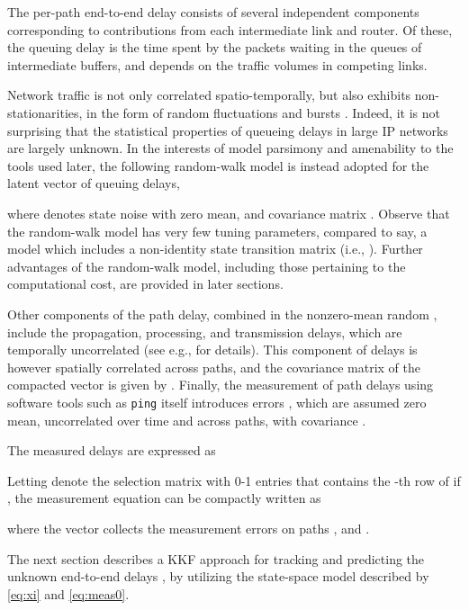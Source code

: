 \documentclass[draftcls,onecolumn,12pt]{IEEEtran}
\theoremstyle{plain}\newtheorem{thm}{Theorem}
\theoremstyle{definition}
\theoremstyle{remark}
\begin{document}
The per-path end-to-end delay  consists of several independent components corresponding to contributions from each intermediate link and router. 
Of these, the queuing delay  is the time spent by the packets waiting in the queues of intermediate buffers, and depends on the traffic volumes in competing links. 
{ Network traffic is not only correlated spatio-temporally, but also exhibits non-stationarities, in the form of random fluctuations and bursts \cite{structural}.
Indeed, it is not surprising that the statistical properties of queueing delays in large IP networks are largely unknown.
In the interests of model parsimony and amenability to the tools used later, the following random-walk model is instead adopted for the latent vector of queuing delays,

where  denotes state noise with zero mean, and covariance matrix . Observe that the random-walk model has very few tuning parameters, compared to say, a model which includes a non-identity state transition matrix (i.e., ). Further advantages of the random-walk model, including those pertaining to the computational cost, are provided in later sections.}

Other components of the path delay, combined in the nonzero-mean random , include the propagation, processing, and transmission delays, which are temporally uncorrelated (see e.g., \cite{bovy} for details).
This component of delays is however spatially correlated across paths, and the covariance matrix of the compacted vector  is given by .
Finally, the measurement of path delays using software tools such as \texttt{ping} itself introduces errors , which are assumed zero mean, uncorrelated over time and across paths, with covariance .

The measured delays are expressed as

Letting  denote the  selection matrix with 0-1 entries that contains the -th row of  if , the measurement equation can be compactly written as

where the vector  collects the measurement errors on paths , and . 

The next section describes a KKF approach for tracking and predicting the unknown end-to-end delays , by utilizing the state-space model described by \eqref{eq:xi} and \eqref{eq:meas0}. 
\end{document}
